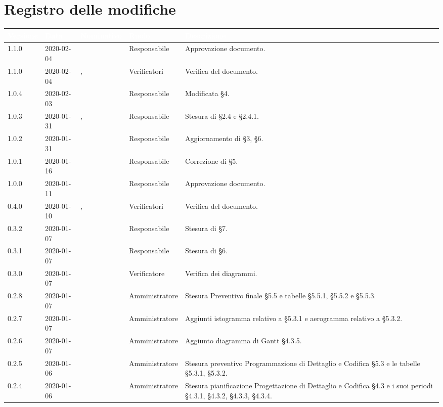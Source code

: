 \section*{Registro delle modifiche}
\setcounter{table}{-1}
{
\renewcommand{\arraystretch}{1.5}
\centering
\begin{longtable}{C{2cm} C{2cm}  C{3cm}  C{3cm} C{4.4cm}}
\textcolor{white}{\textbf{Versione}} &
\textcolor{white}{\textbf{Data}}&
\textcolor{white}{\textbf{Nominativo}}&
\textcolor{white}{\textbf{Ruolo}}&
\textcolor{white}{\textbf{Descrizione}}\\
\endhead

1.1.0 & 2020-02-04 & \MC{} & Responsabile & Approvazione documento. \\
1.1.0 & 2020-02-04 & \BR{}, \PF{} & Verificatori & Verifica del documento. \\
1.0.4 & 2020-02-03 & \MC{} & Responsabile & Modificata §4. \\
1.0.3 & 2020-01-31 & \MC{}, \AT{} & Responsabile & Stesura di §2.4 e §2.4.1. \\
1.0.2 & 2020-01-31 & \AT{} & Responsabile & Aggiornamento di §3, §6. \\
1.0.1 & 2020-01-16 & \SE{} & Responsabile & Correzione di §5. \\
1.0.0 & 2020-01-11 & \SE{} & Responsabile & Approvazione documento. \\
0.4.0 & 2020-01-10 & \AT{}, \MC{} & Verificatori & Verifica del documento. \\
0.3.2 & 2020-01-07 & \SE{} & Responsabile & Stesura di §7. \\
0.3.1 & 2020-01-07 & \SE{} & Responsabile & Stesura di §6. \\
0.3.0 & 2020-01-07 & \MC{} & Verificatore & Verifica dei diagrammi. \\
0.2.8 & 2020-01-07 & \LD{} & Amministratore & Stesura Preventivo finale §5.5 e tabelle §5.5.1, §5.5.2 e §5.5.3. \\
0.2.7 & 2020-01-07 & \LD{} & Amministratore & Aggiunti istogramma relativo a §5.3.1 e aerogramma relativo a §5.3.2. \\
0.2.6 & 2020-01-07 & \LD{} & Amministratore & Aggiunto diagramma di Gantt §4.3.5. \\
0.2.5 & 2020-01-06 & \LD{} & Amministratore & Stesura preventivo Programmazione di Dettaglio e Codifica §5.3 e le tabelle §5.3.1, §5.3.2. \\
0.2.4 & 2020-01-06 & \LD{} & Amministratore & Stesura pianificazione Progettazione di Dettaglio e Codifica §4.3 e i suoi periodi §4.3.1, §4.3.2, §4.3.3, §4.3.4. \\

\end{longtable}}
